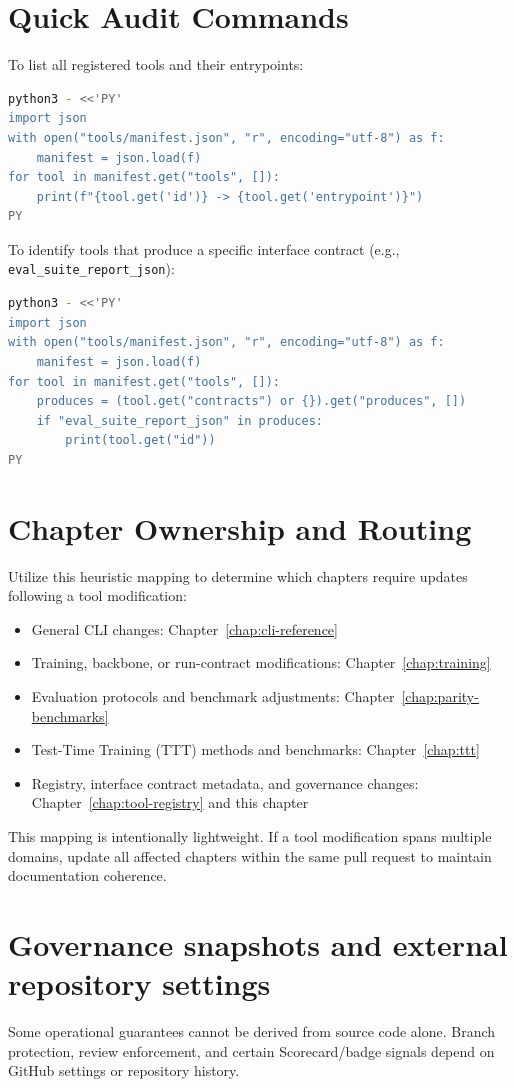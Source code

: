 \section{Quick Audit Commands}
To list all registered tools and their entrypoints:
\begin{lstlisting}[language=bash]
python3 - <<'PY'
import json
with open("tools/manifest.json", "r", encoding="utf-8") as f:
    manifest = json.load(f)
for tool in manifest.get("tools", []):
    print(f"{tool.get('id')} -> {tool.get('entrypoint')}")
PY
\end{lstlisting}

To identify tools that produce a specific interface contract (e.g., \texttt{eval\_suite\_report\_json}):
\begin{lstlisting}[language=bash]
python3 - <<'PY'
import json
with open("tools/manifest.json", "r", encoding="utf-8") as f:
    manifest = json.load(f)
for tool in manifest.get("tools", []):
    produces = (tool.get("contracts") or {}).get("produces", [])
    if "eval_suite_report_json" in produces:
        print(tool.get("id"))
PY
\end{lstlisting}

\section{Chapter Ownership and Routing}
Utilize this heuristic mapping to determine which chapters require updates following a tool modification:
\begin{itemize}
  \item General CLI changes: Chapter~\ref{chap:cli-reference}
  \item Training, backbone, or run-contract modifications: Chapter~\ref{chap:training}
  \item Evaluation protocols and benchmark adjustments: Chapter~\ref{chap:parity-benchmarks}
  \item Test-Time Training (TTT) methods and benchmarks: Chapter~\ref{chap:ttt}
  \item Registry, interface contract metadata, and governance changes: Chapter~\ref{chap:tool-registry} and this chapter
\end{itemize}

This mapping is intentionally lightweight. If a tool modification spans multiple domains, update all affected chapters within the same pull request to maintain documentation coherence.

\section{Governance snapshots and external repository settings}
Some operational guarantees cannot be derived from source code alone. Branch protection, review enforcement, and certain Scorecard/badge signals depend on GitHub settings or repository history.

